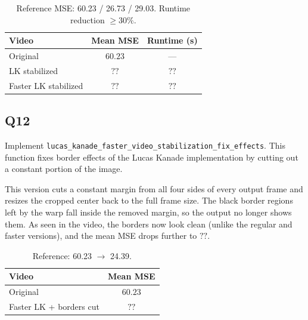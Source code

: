 \documentclass[11pt]{article}
\begin{document}
\begin{table}[H]
    \centering
    \begin{tabular}{lcc}
        \hline
        \textbf{Video}              & \textbf{Mean MSE} & \textbf{Runtime (s)} \\
        \hline
        Original                    & $60.23$ & --- \\
        LK stabilized               & $??$ & $??$ \\
        Faster LK stabilized        & $??$ & $??$ \\
        \hline
    \end{tabular}
    \caption{Reference MSE: 60.23 / 26.73 / 29.03. Runtime reduction $\geq 30\%$.}
\end{table}


\subsection*{Q12}

Implement \texttt{lucas\_kanade\_faster\_video\_stabilization\_fix\_effects}. This function fixes border effects of the Lucas Kanade implementation by cutting out a constant portion of the image.

\medskip
\noindent
This version cuts a constant margin from all four sides of every output frame and
resizes the cropped center back to the full frame size. The black border regions left
by the warp fall inside the removed margin, so the output no longer shows them. As seen
in the video, the borders now look clean (unlike the regular and faster versions), and
the mean MSE drops further to $??$.

\begin{table}[H]
    \centering
    \begin{tabular}{lc}
        \hline
        \textbf{Video}              & \textbf{Mean MSE} \\
        \hline
        Original                    & $60.23$ \\
        Faster LK + borders cut     & $??$ \\
        \hline
    \end{tabular}
    \caption{Reference: 60.23 $\to$ 24.39.}
\end{table}
\end{document}

